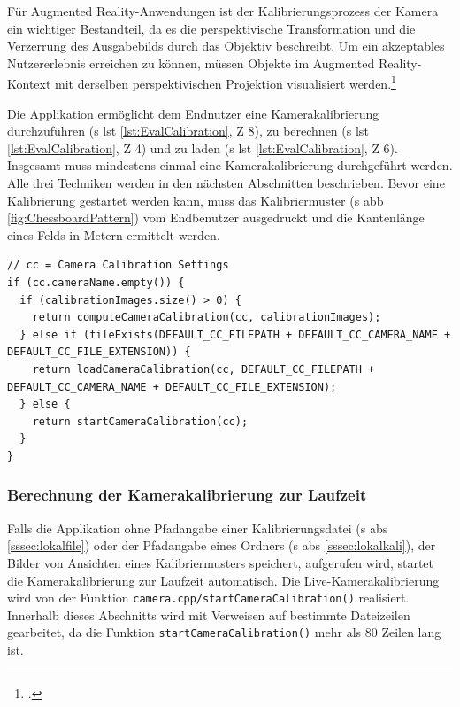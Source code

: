 \noindent Für Augmented Reality-Anwendungen ist der Kalibrierungsprozess der Kamera ein wichtiger Bestandteil, da es die perspektivische Transformation und die Verzerrung des Ausgabebilds durch das Objektiv beschreibt. Um ein akzeptables Nutzererlebnis erreichen zu können, müssen Objekte im Augmented Reality-Kontext mit derselben perspektivischen Projektion visualisiert werden.\footcite[Vgl.][\ac{S} 76]{Baggio2012}

Die Applikation ermöglicht dem Endnutzer eine Kamerakalibrierung durchzuführen (\acs{s} \acs{lst} \ref{lst:EvalCalibration}, \acs{Z} 8), zu berechnen (\acs{s} \acs{lst} \ref{lst:EvalCalibration}, \acs{Z} 4) und zu laden (\acs{s} \acs{lst} \ref{lst:EvalCalibration}, \acs{Z} 6). Insgesamt muss mindestens einmal eine Kamerakalibrierung durchgeführt werden. Alle drei Techniken werden in den nächsten Abschnitten beschrieben. Bevor eine Kalibrierung gestartet werden kann, muss das Kalibriermuster (\acs{s} \acs{abb} \ref{fig:ChessboardPattern}) vom Endbenutzer ausgedruckt und die Kantenlänge eines Felds in Metern ermittelt werden.

\begin{lstlisting}[caption={Ein Ausschnitt der Funktion \texttt{camera.cpp/initializeCamera();} die überprüft, auf welche Art und Weise die Kamerakalibrierung durchgeführt werden soll}, label={lst:EvalCalibration}]
// cc = Camera Calibration Settings
if (cc.cameraName.empty()) {
  if (calibrationImages.size() > 0) {
    return computeCameraCalibration(cc, calibrationImages);
  } else if (fileExists(DEFAULT_CC_FILEPATH + DEFAULT_CC_CAMERA_NAME + DEFAULT_CC_FILE_EXTENSION)) {
    return loadCameraCalibration(cc, DEFAULT_CC_FILEPATH + DEFAULT_CC_CAMERA_NAME + DEFAULT_CC_FILE_EXTENSION);
  } else {
    return startCameraCalibration(cc);
  }
}
\end{lstlisting}

\subsubsection{Berechnung der Kamerakalibrierung zur Laufzeit}\label{sssec:kaliRuntime}
Falls die Applikation ohne Pfadangabe einer Kalibrierungsdatei (\acs{s} \acs{abs} \ref{sssec:lokalfile}) oder der Pfadangabe eines Ordners (\acs{s} \acs{abs} \ref{sssec:lokalkali}), der Bilder von Ansichten eines Kalibriermusters speichert, aufgerufen wird, startet die Kamerakalibrierung zur Laufzeit automatisch. Die Live-Kamerakalibrierung wird von der Funktion \texttt{camera.cpp/startCameraCalibration()} realisiert. Innerhalb dieses Abschnitts wird mit Verweisen auf bestimmte Dateizeilen gearbeitet, da die Funktion \texttt{startCameraCalibration()} mehr als 80 Zeilen lang ist.


